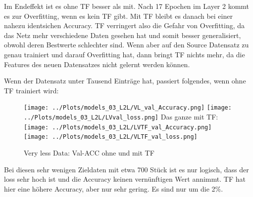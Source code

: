     Im Endeffekt ist es ohne TF besser als mit.
    Nach 17 Epochen im Layer 2 kommt es zur Overfitting, wenn 
    es kein TF gibt. Mit TF bleibt es danach bei einer nahezu 
    identsichen Accuracy. TF verringert also die Gefahr von 
    Overfitting, da das Netz mehr verschiedene Daten gesehen 
    hat und somit besser generalisiert, obwohl deren Bestwerte 
    schlechter sind. 
    Wenn aber auf den Source Datensatz zu genau trainiert und darauf 
    Overfitting hat, dann bringt TF nichts mehr, da die Features 
    des neuen Datensatzes nicht gelernt werden können. 

    Wenn der Datensatz unter Tausend Einträge hat, passiert folgendes, wenn ohne TF trainiert wird: 
    \begin{figure}[htpb]
        \texttt{[image: ../Plots/models\_03\_L2L/VL\_val\_Accuracy.png]}
        \texttt{[image: ../Plots/models\_03\_L2L/LVval\_loss.png]}
        Das ganze mit TF: 
        \texttt{[image: ../Plots/models\_03\_L2L/LVTF\_val\_Accuracy.png]}
        \texttt{[image: ../Plots/models\_03\_L2L/VLTF\_val\_loss.png]}
        \caption{\label{fig:figure5} Very less Data: Val-ACC ohne und mit TF}
    \end{figure}

    Bei diesen sehr wenigen Zieldaten mit etwa 700 Stück ist es nur logisch, dass der loss sehr hoch 
    ist und die Accuracy keinen vernünftigen Wert annimmt. TF hat hier eine höhere Accuracy, aber nur sehr 
    gering. Es sind nur um die 2\%. 

